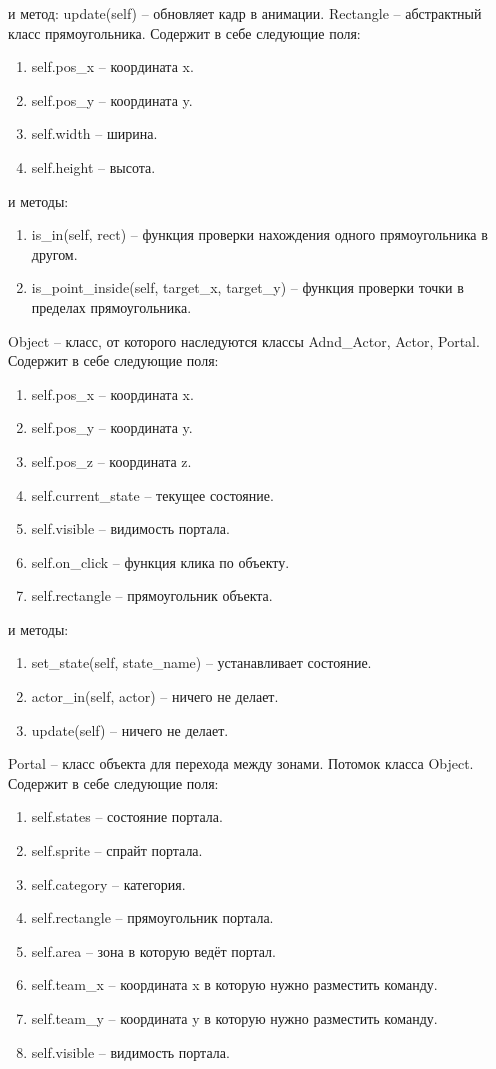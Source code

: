 		и метод: update(self) -- обновляет кадр в анимации.
	Rectangle -- абстрактный класс прямоугольника. Содержит в себе следующие поля:
		\begin{enumerate}
			\item self.pos\_x -- координата x.
			\item self.pos\_y -- координата y.
			\item self.width -- ширина.
			\item self.height -- высота.
		\end{enumerate}
		и методы:
		\begin{enumerate}
			\item is\_in(self, rect) -- функция проверки нахождения одного прямоугольника в другом.
			\item is\_point\_inside(self, target\_x, target\_y) -- функция проверки точки в пределах прямоугольника.
		\end{enumerate}
	Object -- класс, от которого наследуются классы Adnd\_Actor, Actor, Portal. Содержит в себе следующие поля:
		\begin{enumerate}
			\item self.pos\_x -- координата x.
			\item self.pos\_y -- координата y.
			\item self.pos\_z -- координата z.
			\item self.current\_state -- текущее состояние.
			\item self.visible -- видимость портала.
			\item self.on\_click -- функция клика по объекту.
			\item self.rectangle -- прямоугольник объекта.
		\end{enumerate}
		и методы:
		\begin{enumerate}
			\item set\_state(self, state\_name) -- устанавливает состояние.
			\item actor\_in(self, actor) -- ничего не делает.
			\item update(self) -- ничего не делает.
		\end{enumerate}
	Portal -- класс объекта для перехода между зонами. Потомок класса Object. Содержит в себе следующие поля:
		\begin{enumerate}
			\item self.states -- состояние портала.
			\item self.sprite -- спрайт портала.
			\item self.category -- категория.
			\item self.rectangle -- прямоугольник портала.
			\item self.area -- зона в которую ведёт портал.
			\item self.team\_x -- координата x в  которую нужно разместить команду.
			\item self.team\_y -- координата y в  которую нужно разместить команду.
			\item self.visible -- видимость портала.
		\end{enumerate}
